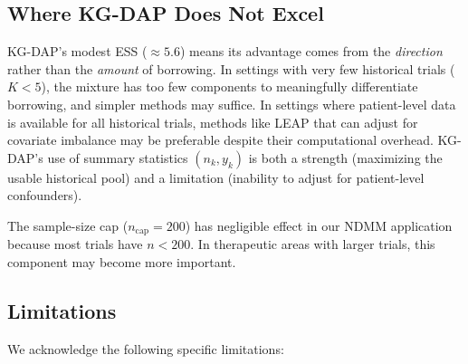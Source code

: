 \documentclass[12pt]{article}
\begin{document}
\subsection{Where KG-DAP Does Not Excel}

KG-DAP's modest ESS ($\approx 5.6$) means its advantage comes from the \emph{direction} rather than the \emph{amount} of borrowing. In settings with very few historical trials ($K < 5$), the mixture has too few components to meaningfully differentiate borrowing, and simpler methods may suffice. In settings where patient-level data is available for all historical trials, methods like LEAP that can adjust for covariate imbalance may be preferable despite their computational overhead. KG-DAP's use of summary statistics $(n_k, y_k)$ is both a strength (maximizing the usable historical pool) and a limitation (inability to adjust for patient-level confounders).

The sample-size cap ($n_{\mathrm{cap}} = 200$) has negligible effect in our NDMM application because most trials have $n < 200$. In therapeutic areas with larger trials, this component may become more important.

\subsection{Limitations}

We acknowledge the following specific limitations:
\end{document}
